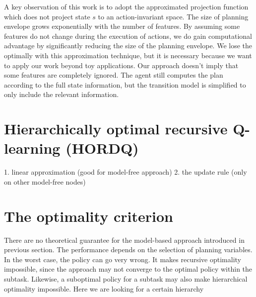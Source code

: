 \documentclass{article} %
\begin{document}
A key observation of this work is to adopt the approximated projection function which
does not project state $s$ to an action-invariant space.
The size of planning envelope grows exponentially with the number of features.
By assuming 
some features do not change during the execution of actions, we do gain computational advantage by
significantly reducing the size of the planning envelope. 
We lose the optimally with this approximation technique, but it is necessary because we want 
to apply our work beyond toy applications.
Our approach doesn't imply that
some features are completely ignored. The agent still computes the plan according to 
the full state information, but the transition model is simplified to only include the 
relevant information.

\section{Hierarchically optimal recursive Q-learning (HORDQ)}
1. linear approximation (good for model-free approach)
2. the update rule (only on other model-free nodes)

\section{The optimality criterion}

There are no theoretical guarantee for the model-based approach introduced in previous 
section. The performance depends on the selection of planning variables. In the worst
case, the policy can go very wrong. It makes recursive optimality impossible, since
the approach may not converge to the optimal policy within the subtask. Likewise,
a suboptimal policy for a subtask may also make hierarchical optimality impossible.
Here we are looking for a certain hierarchy  
\end{document}
